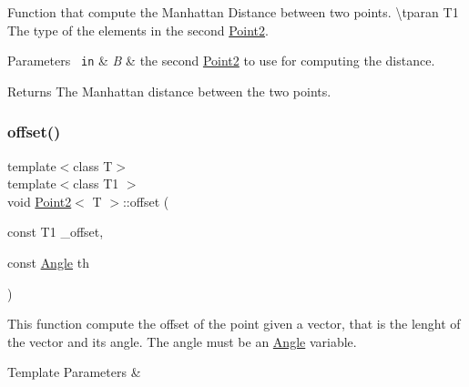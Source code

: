 Function that compute the Manhattan Distance between two points. \textbackslash{}tparan T1 The type of the elements in the second {\ttfamily \mbox{\hyperlink{class_point2}{Point2}}}. 


\begin{DoxyParams}[1]{Parameters}
\mbox{\texttt{ in}}  & {\em B} & the second {\ttfamily \mbox{\hyperlink{class_point2}{Point2}}} to use for computing the distance. \\
\hline
\end{DoxyParams}
\begin{DoxyReturn}{Returns}
The Manhattan distance between the two points. 
\end{DoxyReturn}
\mbox{\label{class_point2_ae55da7a4bd7fe7491ebc0134a39bb791}} 
\subsubsection{\texorpdfstring{offset()}{offset()}\hspace{0.1cm}{\footnotesize\ttfamily [1/3]}}
{\footnotesize\ttfamily template$<$class T$>$ \\
template$<$class T1 $>$ \\
void \mbox{\hyperlink{class_point2}{Point2}}$<$ T $>$\+::offset (\begin{DoxyParamCaption}\item[{const T1}]{\+\_\+offset,  }\item[{const \mbox{\hyperlink{class_angle}{Angle}}}]{th }\end{DoxyParamCaption})\hspace{0.3cm}{\ttfamily [inline]}}



This function compute the offset of the point given a vector, that is the lenght of the vector and its angle. The angle must be an {\ttfamily \mbox{\hyperlink{class_angle}{Angle}}} variable. 


\begin{DoxyTemplParams}{Template Parameters}
{\em } & \\
\hline
\end{DoxyTemplParams}
\mbox{\label{class_point2_ac171989ec252c36ce6253916269186f8}} 
